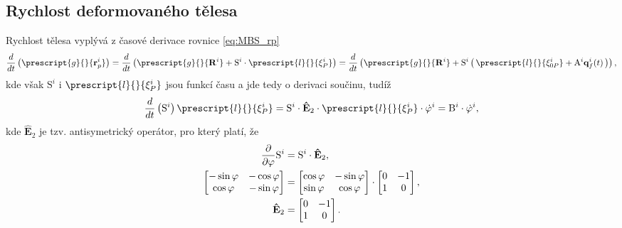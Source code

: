 \subsection{Rychlost deformovaného tělesa}
Rychlost tělesa vyplývá z časové derivace rovnice \ref{eq:MBS_rp}
\begin{equation}\label{eq:MBS_rpdt}
	\frac{d}{dt} \left( \prescript{g}{}{\mathbf{r}_p^i} \right)  = \frac{d}{dt} \left( \prescript{g}{}{\mathbf{R}^i} + \mathrm{S}^{i}\cdot \prescript{l}{}{\mathbf{\xi}^i_P} \right) = \frac{d}{dt} \left( \prescript{g}{}{\mathbf{R}^i} + \mathrm{S}^{i}\left(\, \prescript{l}{}{\mathbf{\xi}^i_{0P}}  + \mathrm{A}^i \mathbf{q}_f^i(t) \,	\right) \right),
\end{equation}
kde však $ \mathrm{S}^i $ i $ \prescript{l}{}{\mathbf{\xi}^i_P} $ jsou funkcí času a jde tedy o derivaci součinu, tudíž
\begin{equation}\label{eq:MBS_Sdt}
	\frac{d}{dt}\left(  \mathrm{S}^i \right)  \prescript{l}{}{\mathbf{\xi}^i_P} = \mathrm{S}^{i} \cdot \mathbf{\hat{E}}_2  \cdot \prescript{l}{}{\mathbf{\xi}^i_P} \cdot \dot{\varphi}^i= \mathrm{B}^i \cdot \dot{\varphi}^i,
\end{equation}
kde $ \mathbf{\hat{E}}_2 $ je tzv. antisymetrický operátor, pro který platí, že 
\begin{align}\label{eq:MBS_E2}
	\frac{\partial}{\partial \varphi}\mathrm{S}^{i} &= \mathrm{S}^{i} \cdot \mathbf{\hat{E}}_2 \notag,\\
	\begin{bmatrix}
		-\sin \varphi & -\cos \varphi \\
		\cos \varphi & -\sin \varphi
	\end{bmatrix}
	&=
	\begin{bmatrix}
		\cos \varphi & -\sin \varphi \\ 
		\sin \varphi & \cos \varphi
	\end{bmatrix}
	\cdot
	\begin{bmatrix}
		0 & -1 \\ 
		1 & 0
	\end{bmatrix} ,\\
	\mathbf{\hat{E}}_2 &= \begin{bmatrix}
		0 & -1 \\ 
		1 & 0
	\end{bmatrix}.
\end{align}
